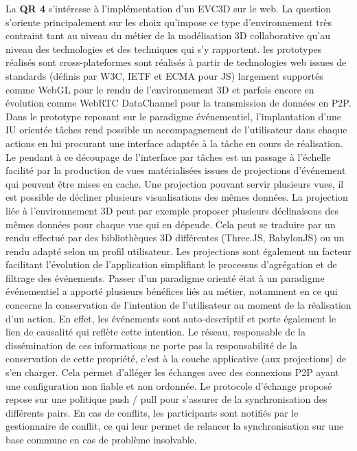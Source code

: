 La \textbf{QR 4} s'intéresse à l'implémentation d'un \gls{EVC3D} sur le web. La 
question s'oriente principalement sur les choix qu'impose ce type d'environnement 
très contraint tant au niveau du métier de la modélisation 3D collaborative 
qu'au niveau des technologies et des techniques qui s'y rapportent.
les prototypes réalisés sont cross-plateformes sont réalisés à partir de 
technologies web issues de standards (définis par \gls{W3C}, \gls{IETF} et 
\acrshort{ECMA} 
pour \gls{JS}) largement supportés comme WebGL pour le rendu de 
l'environnement 3D et parfois encore en évolution comme WebRTC DataChannel 
pour la transmission de données en \gls{P2P}. 
Dans le prototype reposant sur le paradigme événementiel, l'implantation d'une 
\gls{IU} orientée tâches rend possible un accompagnement de l'utilisateur dans 
chaque actions en lui procurant une interface adaptée à la tâche en cours de 
réalisation. Le pendant à ce découpage de l'interface par tâches est un passage à 
l'échelle facilité par la production de vues matérialisées issues de projections 
d'événement qui peuvent être mises en cache. Une projection pouvant servir 
plusieurs vues, il est possible de décliner plusieurs visualisations des mêmes 
données. La projection liée à l'environnement 3D peut par exemple proposer 
plusieurs déclinaisons des mêmes données pour chaque vue qui en dépende. Cela 
peut se traduire par un rendu effectué par des bibliothèques 3D différentes 
(Three.JS, BabylonJS) ou un rendu adapté selon un profil utilisateur. Les 
projections sont également un facteur facilitant l'évolution de l'application 
simplifiant le processus d'agrégation et de filtrage des événements.
Passer d'un paradigme orienté état à un paradigme événementiel a apporté
plusieurs bénéfices liés au métier, notamment en ce qui concerne la conservation 
de l'intention de l'utilisateur au moment de la réalisation d'un action. En effet, les 
événements sont auto-descriptif et porte également le lien de causalité qui reflète 
cette intention. Le réseau, responsable de la dissémination de ces informations ne 
porte pas la responsabilité de la conservation de cette propriété, c'est à la couche 
applicative (aux projections) de s'en charger. Cela permet d'alléger les échanges 
avec des connexions \gls{P2P} ayant une configuration non fiable et non 
ordonnée. Le protocole d'échange proposé repose sur une politique push / pull pour 
s'assurer de la synchronisation des différents pairs. En cas de conflits, les 
participants sont notifiés par le gestionnaire de conflit, ce qui leur permet de 
relancer la synchronisation sur une base commune en cas de problème insolvable. 
